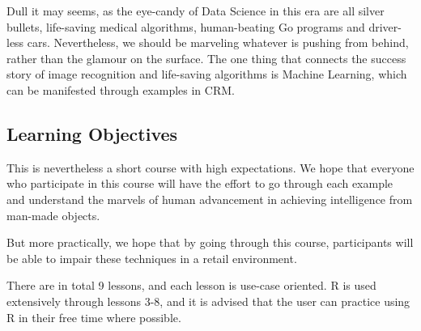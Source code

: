 \documentclass[10pt, a4paper, titlepage]{article}
\begin{document}
Dull it may seems, as the eye-candy of Data Science in this era are all silver bullets, life-saving medical algorithms, human-beating Go programs and driver-less cars.  Nevertheless, we should be marveling whatever is pushing from behind, rather than the glamour on the surface.  The one thing that connects the success story of image recognition and life-saving algorithms is Machine Learning, which can be manifested through examples in CRM.  

\subsection{Learning Objectives}

This is nevertheless a short course with high expectations.  We hope that everyone who participate in this course will have the effort to go through each example and understand the marvels of human advancement in achieving intelligence from man-made objects.  

But more practically, we hope that by going through this course, participants will be able to impair these techniques in a retail environment.  

There are in total 9 lessons, and each lesson is use-case oriented.  R is used extensively through lessons 3-8, and it is advised that the user can practice using R in their free time where possible.  



\newpage 










\end{document}

